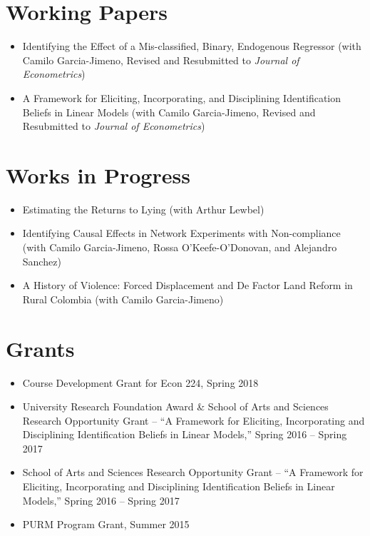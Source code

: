 \documentclass[line,overlapped]{myres}
\begin{document}
\begin{resume}
\section{\sc Working Papers}
\begin{itemize}
  \item Identifying the Effect of a Mis-classified, Binary, Endogenous Regressor (with Camilo Garcia-Jimeno, Revised and Resubmitted to  \emph{Journal of Econometrics})
  \item A Framework for Eliciting, Incorporating, and Disciplining Identification Beliefs in Linear Models (with Camilo Garcia-Jimeno, Revised and Resubmitted to \emph{Journal of Econometrics})
\end{itemize}


\section{\sc Works in Progress}
\begin{itemize}
  \item Estimating the Returns to Lying (with Arthur Lewbel)
  \item Identifying Causal Effects in Network Experiments with Non-compliance (with Camilo Garcia-Jimeno, Rossa O'Keefe-O'Donovan, and Alejandro Sanchez)
  \item A History of Violence: Forced Displacement and De Factor Land Reform in Rural Colombia (with Camilo Garcia-Jimeno)
\end{itemize}

\section{\sc Grants}
\begin{itemize}
  \item Course Development Grant for Econ 224, Spring 2018 
  \item University Research Foundation Award \& School of Arts and Sciences Research Opportunity Grant  -- ``A Framework for Eliciting, Incorporating and Disciplining Identification Beliefs in Linear Models,'' Spring 2016 -- Spring 2017
  \item School of Arts and Sciences Research Opportunity Grant -- ``A Framework for Eliciting, Incorporating and Disciplining Identification Beliefs in Linear Models,'' Spring 2016 -- Spring 2017   
  \item PURM Program Grant, Summer 2015
\end{itemize}



\end{resume}
\end{document}
